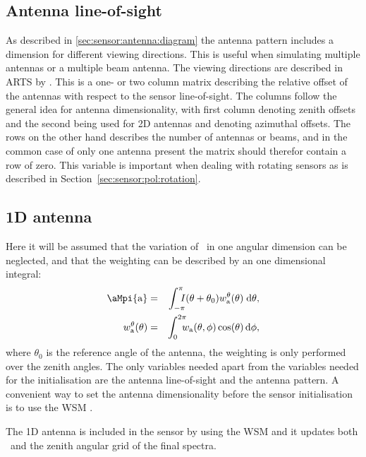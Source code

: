 \subsection{Antenna line-of-sight}
As described in \ref{sec:sensor:antenna:diagram} the antenna pattern
includes a dimension for different viewing directions. This is useful
when simulating multiple antennas or a multiple beam antenna. The
viewing directions are described in ARTS by
. This is a one- or two column matrix
describing the relative offset of the antennas with respect to the
sensor line-of-sight. The columns follow the general idea for antenna
dimensionality, with first column denoting zenith offsets and the
second being used for 2D antennas and denoting azimuthal offsets. The
rows on the other hand describes the number of antennas or beams, and
in the common case of only one antenna present the matrix should
therefor contain a row of zero.  This variable is important when
dealing with rotating sensors as is described in
Section~\ref{sec:sensor:pol:rotation}.

\subsection{1D antenna}
Here it will be assumed that the variation of \Mpi\ in one angular
dimension can be neglected, and that the weighting can be described by
an one dimensional integral:
\begin{eqnarray}
\label{eq:sensor:antenna:1D}
  \aMpi{\mathrm{a}} &=& \int_{-\pi}^\pi\!\!\!\!I(\theta+\theta_0) 
  w_\mathrm{a}^\theta(\theta)\;\mathrm{d}\theta,\\
  w_\mathrm{a}^\theta(\theta) &=& \int_0^{2\pi}\!\!\!\!
  w_\mathrm{a}(\theta,\phi)\cos(\theta)\,\mathrm{d}\phi,
\end{eqnarray}
where $\theta_0$ is the reference angle of the antenna, the weighting
is only performed over the zenith angles. The only variables needed
apart from the variables needed for the initialisation are the antenna
line-of-sight and the antenna pattern. A convenient way to set the
antenna dimensionality before the sensor initialisation is to use the
WSM .

The 1D antenna is included in the sensor by using the WSM
 and it updates both \SnsMtr\ and
the zenith angular grid of the final spectra.


